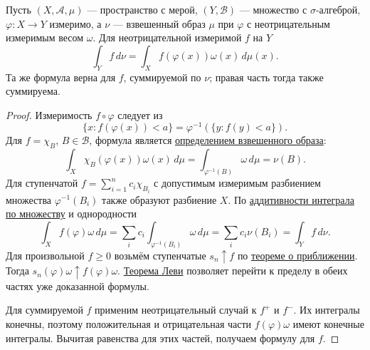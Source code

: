 \label{ticket:30}


\begin{theorem}
Пусть $(X,\mathcal A,\mu)$ --- пространство с мерой, $(Y,\mathcal B)$ --- множество с $\sigma$-алгеброй, $\varphi:X\to Y$ измеримо, а $\nu$ --- взвешенный образ $\mu$ при $\varphi$ с неотрицательным измеримым весом $\omega$.
Для неотрицательной измеримой $f$ на $Y$
\[
  \int_Y f\,d\nu=\int_X f(\varphi(x))\omega(x)\,d\mu(x).
\]
Та же формула верна для $f$, суммируемой по $\nu$; правая часть тогда также суммируема.
\end{theorem}

\begin{proof}
Измеримость $f\circ\varphi$ следует из
\[
  \{x:f(\varphi(x))<a\}=\varphi^{-1}(\{y:f(y)<a\}).
\]
Для $f=\chi_B$, $B\in\mathcal B$, формула является \hyperref[definition:29]{определением взвешенного образа}:
\[
  \int_X\chi_B(\varphi(x))\omega(x)\,d\mu
  =\int_{\varphi^{-1}(B)}\omega\,d\mu=\nu(B).
\]
Для ступенчатой $f=\sum_{i=1}^n c_i\chi_{B_i}$ с допустимым измеримым разбиением множества $\varphi^{-1}(B_i)$ также образуют разбиение $X$.
По \hyperref[ticket:29]{аддитивности интеграла по множеству} и однородности
\[
  \int_X f(\varphi)\omega\,d\mu
  =\sum_i c_i\int_{\varphi^{-1}(B_i)}\omega\,d\mu
  =\sum_i c_i\nu(B_i)=\int_Y f\,d\nu.
\]
Для произвольной $f\ge0$ возьмём ступенчатые $s_n\uparrow f$ по \hyperref[ticket:26]{теореме о приближении}.
Тогда $s_n(\varphi)\omega\uparrow f(\varphi)\omega$.
\hyperref[ticket:35]{Теорема Леви} позволяет перейти к пределу в обеих частях уже доказанной формулы.

Для суммируемой $f$ применим неотрицательный случай к $f^+$ и $f^-$.
Их интегралы конечны, поэтому положительная и отрицательная части $f(\varphi)\omega$ имеют конечные интегралы.
Вычитая равенства для этих частей, получаем формулу для $f$.
\end{proof}
